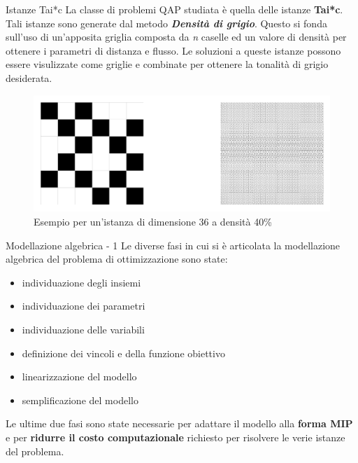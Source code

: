 \documentclass[a4paper]{beamer}
\begin{document}
\begin{frame}{Istanze Tai*c}
La classe di problemi QAP studiata è quella delle istanze \textbf{Tai*c}.
\newline \newline
Tali istanze sono generate dal metodo \textbf{\textit{Densità di grigio}}.
Questo si fonda sull'uso di un'apposita griglia composta da \textit{n} caselle ed un valore di densità per ottenere i parametri 
di distanza e flusso.
\newline \newline
Le soluzioni a queste istanze possono essere visulizzate come griglie e combinate per ottenere la tonalità di grigio desiderata.
\begin{figure}[h!]
    \centering
\includegraphics[scale=0.12]{images/gray_36_40.png}
\caption{Esempio per un'istanza di dimensione 36 a densità 40\%}
\end{figure}   
\end{frame}

\begin{frame}{Modellazione algebrica - 1}
Le diverse fasi in cui si è articolata la modellazione algebrica del problema di ottimizzazione sono state:
\begin{itemize}
\item individuazione degli insiemi
\item individuazione dei parametri
\item individuazione delle variabili
\item definizione dei vincoli e della funzione obiettivo
\item linearizzazione del modello 
\item semplificazione del modello
\end{itemize}
\vfill
Le ultime due fasi sono state necessarie per adattare il modello alla \textbf{forma MIP} e per \textbf{ridurre il costo computazionale}
richiesto per risolvere le verie istanze del problema.
\end{frame}
\end{document}
